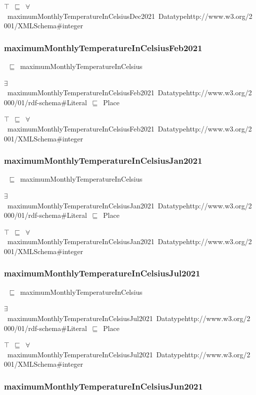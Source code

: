 \documentclass{article}
\begin{document}
\ensuremath{\top}~\ensuremath{\sqsubseteq}~\ensuremath{\forall}~maximumMonthlyTemperatureInCelsiusDec2021~Datatypehttp://www.w3.org/2001/XMLSchema#integer

\subsubsection*{maximumMonthlyTemperatureInCelsiusFeb2021}

~\ensuremath{\sqsubseteq}~maximumMonthlyTemperatureInCelsius

\ensuremath{\exists}~maximumMonthlyTemperatureInCelsiusFeb2021~Datatypehttp://www.w3.org/2000/01/rdf-schema#Literal~\ensuremath{\sqsubseteq}~Place

\ensuremath{\top}~\ensuremath{\sqsubseteq}~\ensuremath{\forall}~maximumMonthlyTemperatureInCelsiusFeb2021~Datatypehttp://www.w3.org/2001/XMLSchema#integer

\subsubsection*{maximumMonthlyTemperatureInCelsiusJan2021}

~\ensuremath{\sqsubseteq}~maximumMonthlyTemperatureInCelsius

\ensuremath{\exists}~maximumMonthlyTemperatureInCelsiusJan2021~Datatypehttp://www.w3.org/2000/01/rdf-schema#Literal~\ensuremath{\sqsubseteq}~Place

\ensuremath{\top}~\ensuremath{\sqsubseteq}~\ensuremath{\forall}~maximumMonthlyTemperatureInCelsiusJan2021~Datatypehttp://www.w3.org/2001/XMLSchema#integer

\subsubsection*{maximumMonthlyTemperatureInCelsiusJul2021}

~\ensuremath{\sqsubseteq}~maximumMonthlyTemperatureInCelsius

\ensuremath{\exists}~maximumMonthlyTemperatureInCelsiusJul2021~Datatypehttp://www.w3.org/2000/01/rdf-schema#Literal~\ensuremath{\sqsubseteq}~Place

\ensuremath{\top}~\ensuremath{\sqsubseteq}~\ensuremath{\forall}~maximumMonthlyTemperatureInCelsiusJul2021~Datatypehttp://www.w3.org/2001/XMLSchema#integer

\subsubsection*{maximumMonthlyTemperatureInCelsiusJun2021}
\end{document}
